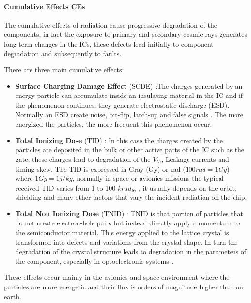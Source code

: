 {{{{				\paragraph{Cumulative Effects CEs}{
					The cumulative effects of radiation cause progressive degradation of the components, in fact the exposure to primary and secondary cosmic rays generates long-term changes in the ICs, these defects lead initially to component degradation and subsequently to faults.
					
					There are three main cumulative effects:
					\begin{itemize}
						\item  \textbf{Surface Charging Damage Effect} (SCDE) :The charges generated by an energy particle can accumulate inside an insulating material in the IC and if the phenomenon continues, they generate electrostatic discharge (ESD). Normally an ESD create noise, bit-flip, latch-up and false signals . The more energized the particles, the more frequent this phenomenon occur.
						
						\item \textbf{Total Ionizing Dose} (TID) : In this case the charges created by the particles are deposited in the bulk or other active parts of the IC such as the gate, these charges lead to degradation of the $V_{th}$, Leakage currents and timing skew. The TID is expressed in Gray (Gy) or rad ($100rad=1Gy$) where $1Gy=1j/kg$, normally in space or avionics missions the typical received TID varies from 1 to 100 $krad_{Si}$ , it usually depends on the orbit, shielding and many other factors that vary the incident radiation on the chip.
						
						\item \textbf{Total Non Ionizing Dose} (TNID) : TNID is that portion of particles that do not create electron-hole pairs but instead directly apply a momentum to the semiconductor material. This energy applied to the lattice crystal is transformed into defects and variations from the crystal shape. In turn the degradation of the crystal structure leads to degradation in the parameters of the component, especially in optoelectronic systems . 
						
					\end{itemize}
					
					These effects occur mainly in the avionics and space environment where the particles are more energetic and their flux is orders of magnitude higher than on earth.
					
}}}}}
